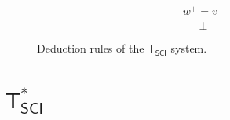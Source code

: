 \documentclass{article}
\theoremstyle{definition}
\theoremstyle{definition}
\theoremstyle{definition}
\newcommand{\TSCI}{$\mathsf{T_{SCI}}$\xspace}
\newcommand{\TsSCI}{$\mathsf{T^*_{SCI}}$\xspace}
\begin{document}
\begin{figure}[h]
\begin{subfigure}{\textwidth}
\begin{subfigure}{0.24\textwidth}
        \end{subfigure}
        \begin{subfigure}{0.24\textwidth}
            \begin{equation}
                \tag{$\bot_2$}
                \frac{
                    w^+ = v^-
                }%
                {\bot}
            \end{equation}
        \end{subfigure}
    \end{subfigure}
    \caption{Deduction rules of the \TSCI system.}
    \label{fig:rules1}
\end{figure}

\section{\TsSCI}
\end{document}
